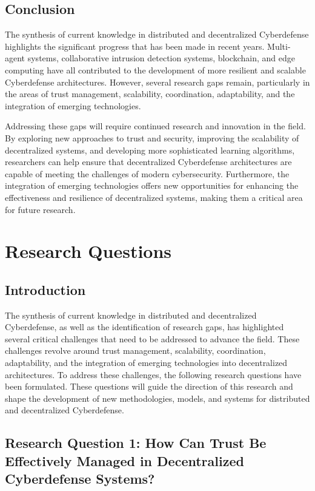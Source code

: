 \subsection{Conclusion}

The synthesis of current knowledge in distributed and decentralized Cyberdefense highlights the significant progress that has been made in recent years. Multi-agent systems, collaborative intrusion detection systems, blockchain, and edge computing have all contributed to the development of more resilient and scalable Cyberdefense architectures. However, several research gaps remain, particularly in the areas of trust management, scalability, coordination, adaptability, and the integration of emerging technologies.

Addressing these gaps will require continued research and innovation in the field. By exploring new approaches to trust and security, improving the scalability of decentralized systems, and developing more sophisticated learning algorithms, researchers can help ensure that decentralized Cyberdefense architectures are capable of meeting the challenges of modern cybersecurity. Furthermore, the integration of emerging technologies offers new opportunities for enhancing the effectiveness and resilience of decentralized systems, making them a critical area for future research.



\section{Research Questions}

\subsection{Introduction}

The synthesis of current knowledge in distributed and decentralized Cyberdefense, as well as the identification of research gaps, has highlighted several critical challenges that need to be addressed to advance the field. These challenges revolve around trust management, scalability, coordination, adaptability, and the integration of emerging technologies into decentralized architectures. To address these challenges, the following research questions have been formulated. These questions will guide the direction of this research and shape the development of new methodologies, models, and systems for distributed and decentralized Cyberdefense.

\subsection{Research Question 1: How Can Trust Be Effectively Managed in Decentralized Cyberdefense Systems?}

